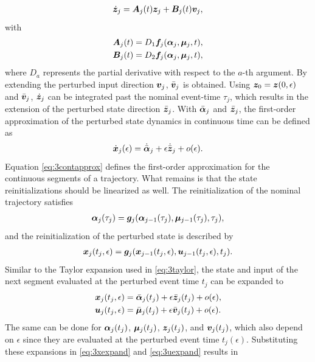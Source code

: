 \documentclass[../DC2017114Bouma.tex]{subfiles}
\begin{document}
\begin{align}
\dot{{\boldsymbol{z}}}_j = {\boldsymbol{A}}_j(t){\boldsymbol{z}}_j +{\boldsymbol{B}}_j(t){\boldsymbol{v}}_j,\label{eq:3zdot}
\end{align}
with
\begin{align}
{\boldsymbol{A}}_j(t) &= D_1{\boldsymbol{f}}_j(\boldsymbol{\alpha}_j,\boldsymbol{\mu}_j,t),\\
{\boldsymbol{B}}_j(t) &= D_2{\boldsymbol{f}}_j(\boldsymbol{\alpha}_j,\boldsymbol{\mu}_j,t),
\end{align}
where $D_a$ represents the partial derivative with respect to the $a$-th argument. By extending the perturbed input direction ${\boldsymbol{v}}_j$, $\bar{{\boldsymbol{v}}}_j$ is obtained. Using ${\boldsymbol{z}}_0={\boldsymbol{z}}(0,\epsilon)$ and $\bar{{\boldsymbol{v}}}_j$, $\dot{{\boldsymbol{z}}}_j$ can be integrated past the nominal event-time $\tau_j$, which results in the extension of the perturbed state direction $\bar{{\boldsymbol{z}}}_j$. With $\bar{\boldsymbol{\alpha}}_j$ and $\bar{{\boldsymbol{z}}}_j$, the first-order approximation of the perturbed state dynamics in continuous time can be defined as
\begin{align}
\dot{{\boldsymbol{x}}}_j(\epsilon) = \dot{\bar{\boldsymbol{\alpha}}}_j + \epsilon\dot{\bar{{\boldsymbol{z}}}}_j + o(\epsilon).\label{eq:3contapprox}
\end{align}
Equation \eqref{eq:3contapprox} defines the first-order approximation for the continuous segments of a trajectory. What remains is that the state reinitializations should be linearized as well. The reinitialization of the nominal trajectory satisfies
\begin{align}
\boldsymbol{\alpha}_{j}(\tau_{j}) = {\boldsymbol{g}}_{j}(\boldsymbol{\alpha}_{j-1}(\tau_{j}),\boldsymbol{\mu}_{j-1}(\tau_{j}),\tau_{j}),\label{eq:3g}
\end{align}
and the reinitialization of the perturbed state is described by
\begin{align}
{\boldsymbol{x}}_{j}(t_{j},\epsilon) = {\boldsymbol{g}}_{j}({\boldsymbol{x}}_{j-1}(t_{j},\epsilon),{\boldsymbol{u}}_{j-1}(t_{j},\epsilon),t_{j}).\label{eq:3gpert}
\end{align}
Similar to the Taylor expansion used in \eqref{eq:3taylor}, the state and input of the next segment evaluated at the perturbed event time $t_{j}$ can be expanded to
\begin{align}
{\boldsymbol{x}}_j(t_{j},\epsilon) &= \bar{\boldsymbol{\alpha}}_j(t_{j}) + \epsilon\bar{{\boldsymbol{z}}}_j(t_{j}) + o(\epsilon),\label{eq:3xexpand}\\
{\boldsymbol{u}}_j(t_{j},\epsilon) &= \bar{\boldsymbol{\mu}}_j(t_{j}) + \epsilon\bar{{\boldsymbol{v}}}_j(t_{j}) + o(\epsilon).\label{eq:3uexpand}
\end{align}
The same can be done for $\boldsymbol{\alpha}_j(t_{j})$, $\boldsymbol{\mu}_j(t_{j})$, ${\boldsymbol{z}}_j(t_{j})$, and ${\boldsymbol{v}}_j(t_{j})$, which also depend on $\epsilon$ since they are evaluated at the perturbed event time $t_j(\epsilon)$. Substituting these expansions in \eqref{eq:3xexpand} and \eqref{eq:3uexpand} results in
\end{document}
